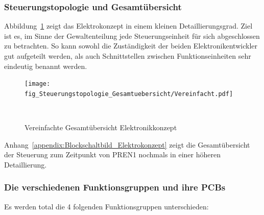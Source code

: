 \documentclass[main.tex]{subfiles} %
\begin{document}

\subsubsection{Steuerungstopologie und Gesamtübersicht}

Abbildung~\ref{fig:Gesamtuebersicht_vereinfacht} zeigt das Elektrokonzept in
einem kleinen Detaillierungsgrad. Ziel ist es, im Sinne der Gewaltenteilung
jede Steuerungseinheit für sich abgeschlossen zu betrachten. So kann sowohl die
Zuständigkeit der beiden Elektronikentwickler gut aufgeteilt werden, als auch
Schnittstellen zwischen Funktionseinheiten sehr eindeutig benannt werden.

\begin{figure}[H]
      \centering
      \texttt{[image: fig\_Steuerungstopologie\_Gesamtuebersicht/Vereinfacht.pdf]}
      \caption{Vereinfachte Gesamtübersicht Elektronikkonzept}~\label{fig:Gesamtuebersicht_vereinfacht}
\end{figure}

Anhang~\ref{appendix:Blockschaltbild_Elektrokonzept} zeigt die Gesamtübersicht
der Steuerung zum Zeitpunkt von PREN1 nochmals in einer höheren Detaillierung.

\subsubsection*{Die verschiedenen Funktionsgruppen und ihre PCBs}
Es werden total die 4 folgenden Funktionsgruppen unterschieden:
\end{document}

